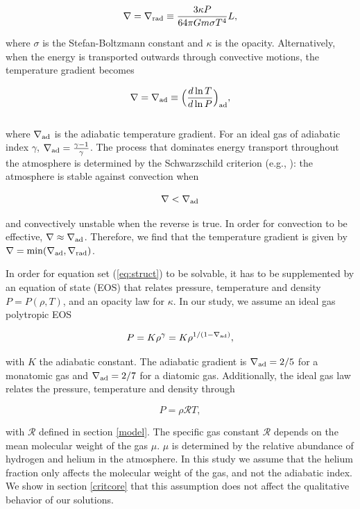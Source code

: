 \documentclass[apj]{emulateapj}
\newcommand{\delad}{\nabla_{\rm ad}}
\newcommand{\delrad}{\nabla_{\rm rad}}
\begin{document}
\begin{equation}
\label{eq:delrad}
\nabla = \delrad \equiv \frac{3 \kappa P}{64 \pi G m \sigma T^4} L,
\end{equation}

\noindent where $\sigma$ is the Stefan-Boltzmann constant and $\kappa$ is the opacity. Alternatively, when the energy is transported outwards through convective motions, the temperature gradient becomes


\begin{equation}
\label{eq:delad}
\nabla = \delad \equiv \Big(\frac{d \ln T}{d \ln P}\Big)_{\mathrm{ad}},
\end{equation}
\\

\noindent where $\delad$ is the adiabatic temperature gradient. For an ideal gas of adiabatic index $\gamma$, $\delad=\frac{\gamma-1}{\gamma}$. The process that dominates energy transport throughout the atmosphere is determined by the Schwarzschild criterion (e.g., \citealt{thompson06}): the atmosphere is stable against convection when

\begin{equation}
\label{eq:schwarz}
\nabla < \delad
\end{equation}

\noindent and convectively unstable when the reverse is true. In order for convection to be effective, $\nabla \approx \delad$. Therefore, we find that the temperature gradient is given by $\nabla=\mathrm{min}(\delad, \delrad)$. 

In order for equation set (\ref{eq:struct}) to be solvable, it has to be supplemented by an equation of state (EOS) that relates pressure, temperature and density $P=P(\rho, T)$, and an opacity law for $\kappa$. In our study, we assume an ideal gas polytropic EOS 

\begin{equation}
\label{eq:polyEOS}
P=K \rho^{\gamma}=K \rho^{1/(1-\delad)},
\end{equation}

\noindent with $K$ the adiabatic constant. The adiabatic gradient is $\delad=2/5$ for a monatomic gas and $\delad=2/7$ for a diatomic gas. Additionally, the ideal gas law relates the pressure, temperature and density through

\begin{equation}
\label{eq:idealgas}
P=\rho \mathcal{R} T,
\end{equation}

\noindent with $\mathcal{R}$ defined in section \ref{model}. The specific gas constant $\mathcal{R}$ depends on the mean molecular weight of the gas $\mu$. $\mu$ is determined by the relative abundance of hydrogen and helium in the atmosphere. In this study we assume that the helium fraction only affects the molecular weight of the gas, and not the adiabatic index. We show in section \ref{critcore} that this assumption does not affect the qualitative behavior of our solutions.
\end{document}
